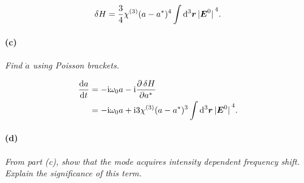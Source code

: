 \documentclass[hyperref, a4paper]{article}
\newcommand*{\ii}{\mathrm{i}}
\begin{document}
\begin{equation}
    \var{H} = \frac{3}{4} \chi^{(3)} (a - a^*)^4 \int \dd[3]{\vb*{r}} \abs*{\vb*{E}^0}^4.
\end{equation}

\paragraph*{(c)} \textit{Find $\dot{a}$ using Poisson brackets.} 

\begin{equation}
    \begin{aligned}
        \dv{a}{t} &= - \ii \omega_0 a - \ii \pdv{\var{H}}{a^*} \\
        &= - \ii \omega_0 a + \ii 3 \chi^{(3)} (a - a^*)^3 \int \dd[3]{\vb*{r}} \abs*{\vb*{E}^0}^4.
    \end{aligned}
\end{equation}

\paragraph*{(d)} \textit{From part (c), show that the mode acquires intensity dependent frequency shift. Explain the significance of this term.} 
\end{document}
